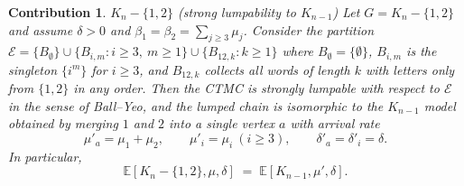 \documentclass[11pt]{article}
\newtheorem{contribution}{Contribution}
\begin{document}
\begin{contribution}{$K_n-\{1,2\}$ (strong lumpability to $K_{n-1}$)}
	Let $G=K_n-\{1,2\}$ and assume $\delta>0$ and $\beta_1=\beta_2=\sum_{j\ge3}\mu_j$. Consider the partition $\mathcal{E}=\{B_{\emptyset}\}\cup\{B_{i,m}: i\ge3,\ m\ge1\}\cup\{B_{12,k}:k\ge1\}$ where $B_{\emptyset}=\{\emptyset\}$, $B_{i,m}$ is the singleton $\{i^m\}$ for $i\ge3$, and $B_{12,k}$ collects all words of length $k$ with letters only from $\{1,2\}$ in any order. Then the CTMC is \emph{strongly lumpable} with respect to $\mathcal{E}$ in the sense of Ball–Yeo, and the lumped chain is isomorphic to the $K_{n-1}$ model obtained by merging $1$ and $2$ into a single vertex $a$ with arrival rate
	\[
	\mu'_a=\mu_1+\mu_2,\qquad \mu'_i=\mu_i\ (i\ge3),\qquad \delta'_a=\delta'_i=\delta.
	\]
	In particular,
	\begin{equation}\label{eq:EV-Kn12-equals-Kn-1}
		\mathbb{E}[K_n-\{1,2\},\mu,\delta]\;=\;\mathbb{E}[K_{n-1},\mu',\delta].
	\end{equation}
\end{contribution}
\end{document}
